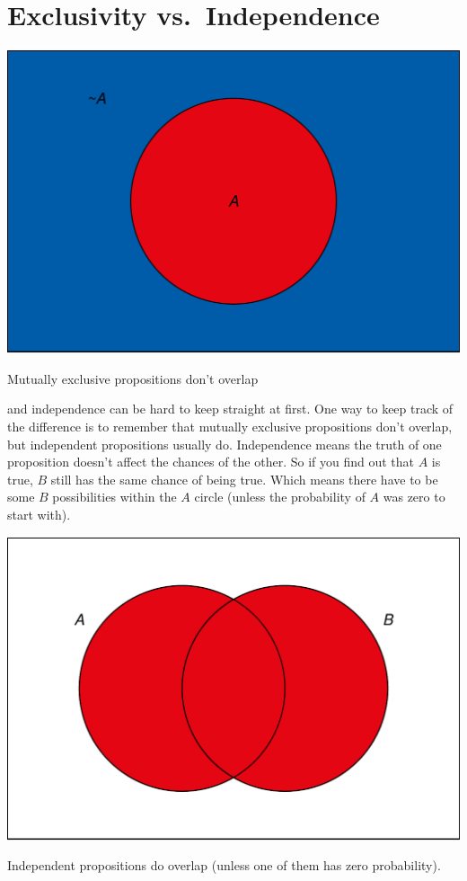 \documentclass[justified]{tufte-book}
\theoremstyle{definition}
\theoremstyle{definition}
\theoremstyle{definition}
\theoremstyle{remark}
\begin{document}
\hypertarget{exclusivity-vs.independence}{%
\section{Exclusivity
vs.~Independence}\label{exclusivity-vs.independence}}

\begin{marginfigure}
\includegraphics{_main_files/figure-latex/unnamed-chunk-56-1} \caption[Mutually exclusive propositions don't overlap]{Mutually exclusive propositions don't overlap}\label{fig:unnamed-chunk-56}
\end{marginfigure}

 and independence can be hard to keep straight
at first. One way to keep track of the difference is to remember that
mutually exclusive propositions don't overlap, but independent
propositions usually do. Independence means the truth of one proposition
doesn't affect the chances of the other. So if you find out that \(A\)
is true, \(B\) still has the same chance of being true. Which means
there have to be some \(B\) possibilities within the \(A\) circle
(unless the probability of \(A\) was zero to start with).

\begin{marginfigure}
\includegraphics{_main_files/figure-latex/unnamed-chunk-57-1} \caption[Independent propositions do overlap (unless one of them has zero probability)]{Independent propositions do overlap (unless one of them has zero probability).}\label{fig:unnamed-chunk-57}
\end{marginfigure}
\end{document}
